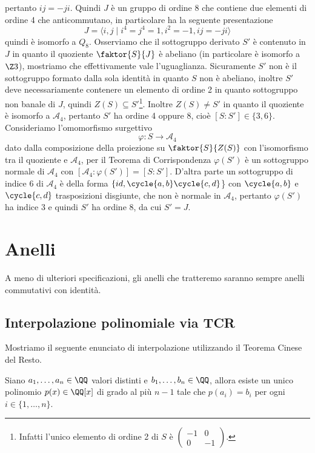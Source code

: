 \documentclass[11pt]{scrartcl}
\begin{document}
	pertanto $ij = -ji$. Quindi $J$ è un gruppo di ordine $8$ che contiene due
	elementi di ordine 4 che anticommutano, in particolare ha la seguente presentazione
	\[
	J = \langle i, j\mid i^4 = j^4 = 1, i^2 = -1, ij = -ji\rangle
	\]
	quindi è isomorfo a $Q_8$. Osserviamo che il sottogruppo derivato $S'$ è 
	contenuto in $J$ in quanto il quoziente $\faktor{S}{J}$ è abeliano (in particolare
	è isomorfo a $\Z3$), mostriamo che effettivamente vale l'uguaglianza. 
	Sicuramente $S'$ non è il sottogruppo formato dalla sola identità in quanto 
	$S$ non è abeliano, inoltre $S'$ deve necessariamente contenere un elemento di 
	ordine 2 in quanto sottogruppo non banale di $J$, quindi $Z(S) \subseteq S'$\footnote{
		Infatti l'unico elemento di ordine 2 di $S$ è $\begin{pmatrix}-1 & 0\\
			0 & -1\end{pmatrix}$.
	}. Inoltre $Z(S) \neq S'$ in quanto il quoziente è isomorfo a $\mathcal{A}_4$,
	pertanto $S'$ ha ordine 4 oppure 8, cioè $[S: S'] \in \{3, 6\}$.
	Consideriamo l'omomorfismo surgettivo 
	\[
	\varphi: S \longrightarrow \mathcal{A}_4
	\]
	dato dalla composizione della proiezione su $\faktor{S}{Z(S)}$ con l'isomorfismo
	tra il quoziente e $\mathcal{A}_4$, per il Teorema di Corrispondenza $\varphi(S')$
	è un sottogruppo normale di $\mathcal{A}_4$ con 
	$[\mathcal{A}_4: \varphi(S')] = [S: S']$. D'altra parte un sottogruppo di 
	indice 6 di $\mathcal{A}_4$ è della forma $\{id, \cycle{a, b}\cycle{c, d}$\}
	con $\cycle{a, b}$ e $\cycle{c, d}$ trasposizioni disgiunte, che non è normale
	in $\mathcal{A}_4$, pertanto $\varphi(S')$ ha indice 3 e quindi $S'$ ha ordine
	8, da cui $S' = J$.
	
	
	\newpage
	
	\section{Anelli}
	
	A meno di ulteriori specificazioni, gli anelli che tratteremo saranno sempre 
	anelli commutativi con identità.
	
	\subsection{Interpolazione polinomiale via TCR}
	
	Mostriamo il seguente enunciato di interpolazione utilizzando il Teorema
	Cinese del Resto.
	
	\begin{proposition}
		Siano $a_1, \ldots, a_n \in \QQ$ valori distinti e $b_1, \ldots, b_n \in \QQ$,
		allora esiste un unico polinomio $p(x) \in \QQ[x]$ di grado al più $n - 1$
		tale che $p(a_i) = b_i$ per ogni $i \in \{1, \ldots, n\}$. 
	\end{proposition}
	
\end{document}
